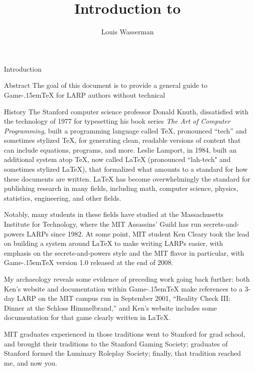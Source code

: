 \documentclass[11pt,  total={6in, 8in}]{article}
\title{Introduction to \gametex{}}
\author{Louis Wasserman}
\def\gametex{\mbox{Game\kern-.15em\TeX}}
\begin{document}
\maketitle{}
\tableofcontents
\begin{section}{Introduction}
\begin{subsection}{Abstract}
The goal of this document is to provide a general guide to \gametex{} for LARP authors without technical
\end{subsection}
\begin{subsection}{History}
The Stanford computer science professor Donald Knuth, dissatisfied with the technology of 1977 for typesetting his book series \textit{The Art of Computer Programming}, built a programming language called TeX,
pronounced ``tech'' and sometimes stylized \TeX{}, for generating clean, readable versions of content that can include equations, programs, and more. 
Leslie Lamport, in 1984, built an additional system atop \TeX{}, now called LaTeX (pronounced ``lah-tech" and sometimes stylized \LaTeX{}), that formalized what amounts to a standard for how these documents are written.  LaTeX has become overwhelmingly the standard for publishing research in many fields, including math, computer science, physics, statistics, engineering, and other fields.

Notably, many students in these fields have studied at the Massachusetts Institute for Technology, where the MIT Assassins' Guild has run secrets-and-powers LARPs since 1982. 
At some point, MIT student Ken Cleary took the lead on building a system around \LaTeX{} to make writing LARPs easier, with emphasis on the secrets-and-powers style and the MIT flavor in particular, with \gametex{} version 1.0 released at the end of 2008. 

 My archaeology reveals some evidence of preceding work going back further: both Ken's website and documentation within \gametex{} make references to a 3-day LARP on the MIT campus run in September 2001, ``Reality Check III: Dinner at the Schloss Himmelbrand,'' and Ken's website includes some documentation for that game clearly written in \LaTeX{}.

MIT graduates experienced in those traditions went to Stanford for grad school, and brought their traditions to the Stanford Gaming Society; graduates of Stanford formed the Luminary Roleplay Society; finally, that tradition reached me, and now you.


\end{subsection}
\end{section}
\end{document}

